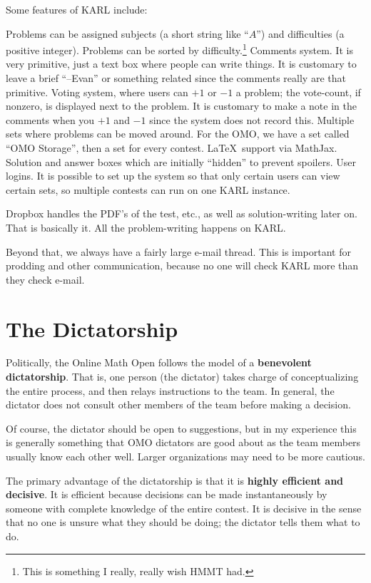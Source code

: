 \documentclass[11pt]{scrreprt}
\begin{document}
Some features of KARL include:
\begin{itemize}
  \ii Problems can be assigned subjects (a short string like ``$A$'') and difficulties (a positive integer).
  Problems can be sorted by difficulty.\footnote{This is something I really, really wish HMMT had.}
  \ii Comments system. It is very primitive, just a text box where people can write things.
  It is customary to leave a brief ``--Evan'' or something related since the comments really are that primitive.
  \ii Voting system, where users can $+1$ or $-1$ a problem; the vote-count, if nonzero, is displayed next to the problem.
  It is customary to make a note in the comments when you $+1$ and $-1$ since the system does not record this.
  \ii Multiple sets where problems can be moved around. For the OMO, we have a set called ``OMO Storage'', then a set for every contest.
  \ii \LaTeX\ support via MathJax.
  \ii Solution and answer boxes which are initially ``hidden'' to prevent spoilers.
  \ii User logins. It is possible to set up the system so that only certain users can view certain sets,
  so multiple contests can run on one KARL instance.
\end{itemize}

Dropbox handles the PDF's of the test, etc., as well as solution-writing later on.  That is basically it.  All the problem-writing happens on KARL.

Beyond that, we always have a fairly large e-mail thread.  This is important for prodding and other communication, because no one will check KARL more than they check e-mail.

\section{The Dictatorship}
Politically, the Online Math Open follows the model of a \textbf{benevolent dictatorship}. That is, one person (the dictator) takes charge of conceptualizing the entire process, and then relays instructions to the team.
In general, the dictator does not consult other members of the team before making a decision.

Of course, the dictator should be open to suggestions, but in my experience this is generally something that OMO dictators are good about as the team members usually know each other well. Larger organizations may need to be more cautious.

The primary advantage of the dictatorship is that it is \textbf{highly efficient and decisive}. It is efficient because decisions can be made instantaneously by someone with complete knowledge of the entire contest.
It is decisive in the sense that no one is unsure what they should be doing; the dictator tells them what to do.
\end{document}
